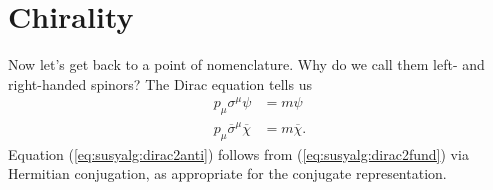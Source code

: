 \documentclass[12pt]{article}
\numberwithin{equation}{section}    %
\begin{document}
\section{Chirality}\label{sec:SUSYalg:sec:chirality}

Now let's get back to a point of nomenclature. Why do we call them left- and right-handed spinors? The Dirac equation tells us%
\begin{align}
	p_\mu\sigma^\mu \psi &= m \psi\label{eq:susyalg:dirac2fund}\\
	p_\mu\overline\sigma^\mu \overline\chi &= m \overline\chi\label{eq:susyalg:dirac2anti}.
\end{align}
Equation (\ref{eq:susyalg:dirac2anti}) follows from  (\ref{eq:susyalg:dirac2fund}) via Hermitian conjugation, as appropriate for the conjugate representation. 
\end{document}
